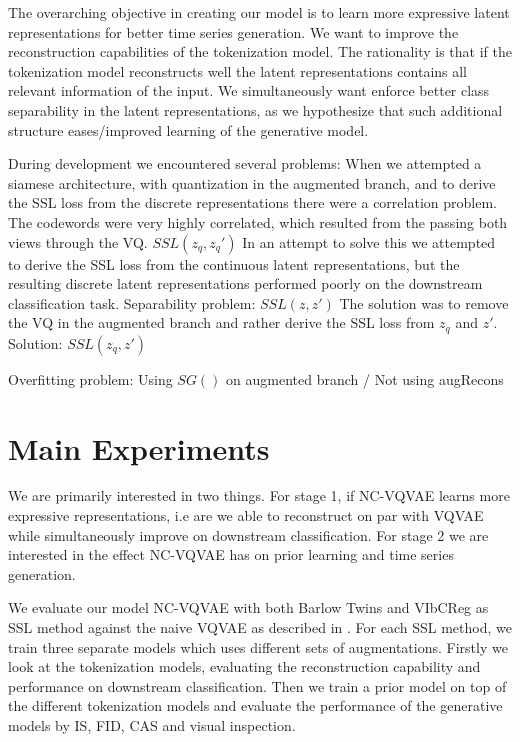 \documentclass[../../thesis.tex]{subfiles}
\begin{document}
The overarching objective in creating our model is to learn more expressive latent representations for better time series generation. We want to improve the reconstruction capabilities of the tokenization model. The rationality is that if the tokenization model reconstructs well the latent representations contains all relevant information of the input. We simultaneously want enforce better class separability in the latent representations, as we hypothesize that such additional structure eases/improved learning of the generative model.\newline

During development we encountered several problems:\newline
When we attempted a siamese architecture, with quantization in the augmented branch, and to derive the SSL loss from the discrete representations there were a correlation problem. The codewords were very highly correlated, which resulted from the passing both views through the VQ.  $SSL(z_q,z_q')$ \newline
In an attempt to solve this we attempted to derive the SSL loss from the continuous latent representations, but the resulting discrete latent representations performed poorly on the downstream classification task. Separability problem: $SSL(z,z')$ \newline
The solution was to remove the VQ in the augmented branch and rather derive the SSL loss from $z_q$ and $z'$. Solution: $SSL(z_q,z')$ \newline

Overfitting problem: Using $SG()$ on augmented branch / Not using augRecons \newline

\section{Main Experiments}

We are primarily interested in two things. For stage 1, if NC-VQVAE learns more expressive representations, i.e are we able to reconstruct on par with VQVAE while simultaneously improve on downstream classification. For stage 2 we are interested in the effect NC-VQVAE has on prior learning and time series generation. \newline

We evaluate our model NC-VQVAE with both Barlow Twins and VIbCReg as SSL method against the naive VQVAE as described in \cite{TimeVQVAE}. For each SSL method, we train three separate models which uses different sets of augmentations. Firstly we look at the tokenization models, evaluating the reconstruction capability and performance on downstream classification. Then we train a prior model on top of the different tokenization models and evaluate the performance of the generative models by IS, FID, CAS and visual inspection.\newline
\end{document}
